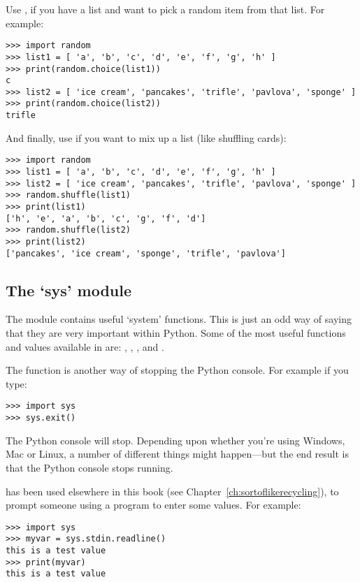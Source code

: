 Use ,  if you have a list and want to pick a random item from that list. For example:

\begin{Verbatim}[frame=single]
>>> import random
>>> list1 = [ 'a', 'b', 'c', 'd', 'e', 'f', 'g', 'h' ]
>>> print(random.choice(list1))
c
>>> list2 = [ 'ice cream', 'pancakes', 'trifle', 'pavlova', 'sponge' ]
>>> print(random.choice(list2))
trifle
\end{Verbatim}

And finally, use  if you want to mix up a list (like shuffling cards):

\begin{Verbatim}[frame=single]
>>> import random
>>> list1 = [ 'a', 'b', 'c', 'd', 'e', 'f', 'g', 'h' ]
>>> list2 = [ 'ice cream', 'pancakes', 'trifle', 'pavlova', 'sponge' ]
>>> random.shuffle(list1)
>>> print(list1)
['h', 'e', 'a', 'b', 'c', 'g', 'f', 'd']
>>> random.shuffle(list2)
>>> print(list2)
['pancakes', 'ice cream', 'sponge', 'trifle', 'pavlova']
\end{Verbatim}

\subsection*{The `sys' module}

The  module contains useful `system' functions. This is just an odd way of saying that they are very important within Python. Some of the most useful functions and values available in  are: , , , and .
\par
The  function is another way of stopping the Python console. For example if you type:

\begin{Verbatim}[frame=single]
>>> import sys
>>> sys.exit()
\end{Verbatim}

The Python console will stop. Depending upon whether you're using Windows, Mac or Linux, a number of different things might happen---but the end result is that the Python console stops running.

 has been used elsewhere in this book (see Chapter~\ref{ch:sortoflikerecycling}), to prompt someone using a program to enter some values. For example:

\begin{Verbatim}[frame=single]
>>> import sys
>>> myvar = sys.stdin.readline()
this is a test value
>>> print(myvar)
this is a test value
\end{Verbatim}

